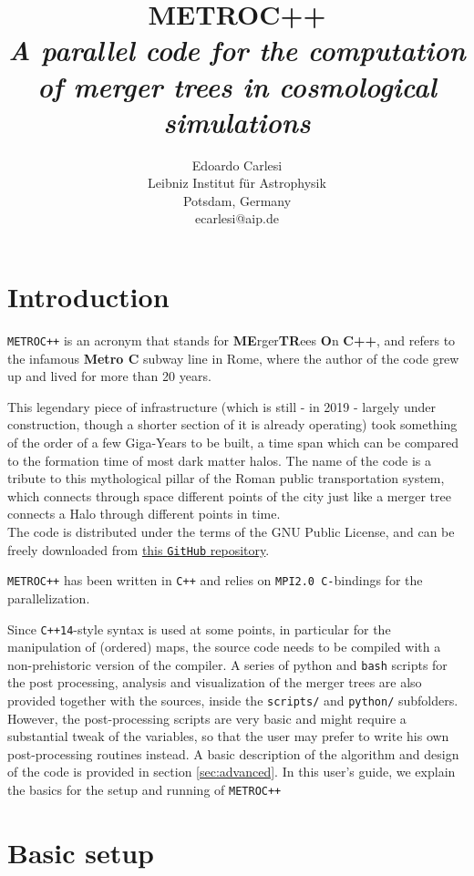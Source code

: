 \documentclass{article}
\title{\textbf{METROC++} \\
\emph{A parallel code for the computation of merger trees in 
cosmological simulations}}
\author{Edoardo Carlesi\\ Leibniz Institut f\"ur Astrophysik\\ Potsdam, Germany\\ ecarlesi@aip.de}
\begin{document}
\maketitle
\tableofcontents
\newpage

\section{Introduction}
\texttt{METROC++} is an acronym that stands for \textbf{ME}rger\textbf{TR}ees \textbf{O}n \textbf{C++}, and refers to the 
infamous \textbf{Metro C} subway line in Rome, where the author of the code grew up and lived for more than 20 years.

This legendary piece of infrastructure (which is still - in 2019 - largely under construction, though a shorter section of 
it is already operating) took something of the order of a few Giga-Years to be built, a time span which can be compared to the
formation time of most dark matter halos. The name of the code is a tribute to this mythological pillar of the Roman public
transportation system, which connects through space different points of the city just like a merger tree connects a Halo 
through different points in time.\\

The code is distributed under the terms of the GNU Public License, and can be freely downloaded from 
\href{https://github.com/EdoardoCarlesi/MetroCPP}{this \texttt{GitHub} repository}.

\texttt{METROC++} has been written in \texttt{C++} and relies on \texttt{MPI2.0 C-}bindings for the parallelization.

Since \texttt{C++14}-style syntax is used at some points, in particular for the manipulation
of (ordered) maps, the source code needs to be compiled with a non-prehistoric version of the compiler.
A series of python and \texttt{bash} scripts for the post processing, analysis and visualization of the merger trees are also provided 
together with the sources, inside the \texttt{scripts/} and \texttt{python/} subfolders. 
However, the post-processing scripts are very basic and might require a substantial tweak of the variables, so that the user
may prefer to write his own post-processing routines instead.
A basic description of the algorithm and design of the code is provided in section \ref{sec:advanced}.
In this user's guide, we explain the basics for the setup and running of \texttt{METROC++}


\section{Basic setup}
\end{document}
